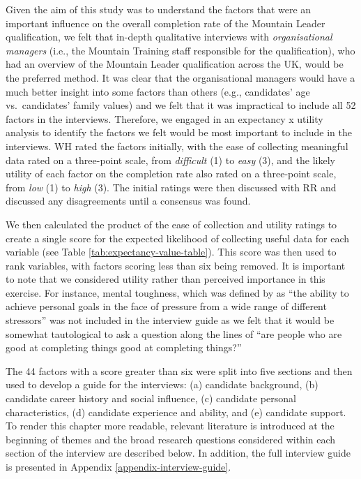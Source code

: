 \documentclass[
  12pt,
  a4paper,
]{book}
\begin{document}
Given the aim of this study was to understand the factors that were an important influence on the overall completion rate of the Mountain Leader qualification, we felt that in-depth qualitative interviews with \emph{organisational managers} (i.e., the Mountain Training staff responsible for the qualification), who had an overview of the Mountain Leader qualification across the UK, would be the preferred method. It was clear that the organisational managers would have a much better insight into some factors than others (e.g., candidates' age vs.~candidates' family values) and we felt that it was impractical to include all 52 factors in the interviews. Therefore, we engaged in an expectancy x utility analysis to identify the factors we felt would be most important to include in the interviews. WH rated the factors initially, with the ease of collecting meaningful data rated on a three-point scale, from \emph{difficult} (1) to \emph{easy} (3), and the likely utility of each factor on the completion rate also rated on a three-point scale, from \emph{low} (1) to \emph{high} (3). The initial ratings were then discussed with RR and discussed any disagreements until a consensus was found.

We then calculated the product of the ease of collection and utility ratings to create a single score for the expected likelihood of collecting useful data for each variable (see Table \ref{tab:expectancy-value-table}). This score was then used to rank variables, with factors scoring less than six being removed. It is important to note that we considered utility rather than perceived importance in this exercise. For instance, mental toughness, which was defined by \citet{Bell2013} as ``the ability to achieve personal goals in the face of pressure from a wide range of different stressors'' was not included in the interview guide as we felt that it would be somewhat tautological to ask a question along the lines of ``are people who are good at completing things good at completing things?''

The 44 factors with a score greater than six were split into five sections and then used to develop a guide for the interviews: (a) candidate background, (b) candidate career history and social influence, (c) candidate personal characteristics, (d) candidate experience and ability, and (e) candidate support. To render this chapter more readable, relevant literature is introduced at the beginning of themes and the broad research questions considered within each section of the interview are described below. In addition, the full interview guide is presented in Appendix \ref{appendix-interview-guide}.
\end{document}
